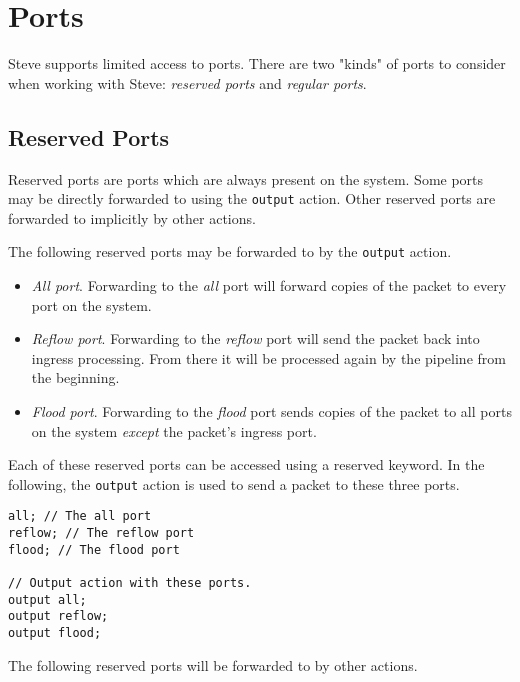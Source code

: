 \section{Ports} \label{tut:ports}

Steve supports limited access to ports.
There are two "kinds" of ports to consider when working with Steve: \textit{reserved ports} and
\textit{regular ports}.

\subsection {Reserved Ports} \label{tut:reserved_ports}

Reserved ports are ports which are always present on the system. Some ports may
be directly forwarded to using the \texttt{output} action. Other reserved ports are forwarded to implicitly by
other actions.

The following reserved ports may be forwarded to by the \texttt{output} action.

\begin{itemize}
\item \emph{All port}. Forwarding to the \textit{all} port will forward copies of the packet to
every port on the system.

\item \emph{Reflow port}. Forwarding to the \textit{reflow} port will send the packet back into
ingress processing. From there it will be processed again by the pipeline from
the beginning.

\item \emph{Flood port}. Forwarding to the \textit{flood} port sends copies of the packet to all
ports on the system \textit{except} the packet's ingress port.
\end{itemize}

Each of these reserved ports can be accessed using a reserved keyword. In the
following, the \texttt{output} action is used to send a packet to these three
ports.

\begin{codepage}
\begin{lstlisting}
all; // The all port
reflow; // The reflow port
flood; // The flood port

// Output action with these ports.
output all;
output reflow;
output flood;
\end{lstlisting}
\end{codepage}

The following reserved ports will be forwarded to by other actions.

